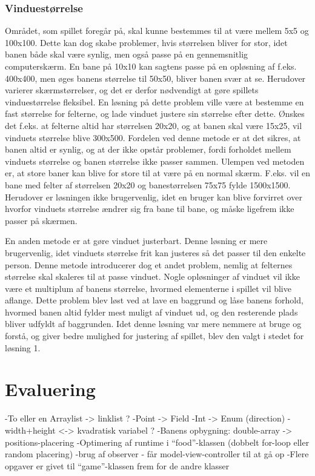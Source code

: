 \documentclass{report}
\begin{document}
\subsubsection{Vinduestørrelse}
Området, som spillet foregår på, skal kunne bestemmes til at være mellem 5x5 og 100x100. Dette kan dog skabe problemer, hvis størrelsen bliver for stor, idet banen både skal være synlig, men også passe på en gennemsnitlig computerskærm. En bane på 10x10 kan sagtens passe på en opløsning af f.eks. 400x400, men øges banens størrelse til 50x50, bliver banen svær at se. Herudover varierer skærmstørrelser, og det er derfor nødvendigt at gøre spillets vinduestørrelse fleksibel. En løsning på dette problem ville være at bestemme en fast størrelse for felterne, og lade vinduet justere sin størrelse efter dette. Ønskes det f.eks. at felterne altid har størrelsen 20x20, og at banen skal være 15x25, vil vinduets størrelse blive 300x500. Fordelen ved denne metode er at det sikres, at banen altid er synlig, og at der ikke opstår problemer, fordi forholdet mellem vinduets størrelse og banen størrelse ikke passer sammen. Ulempen ved metoden er, at store baner kan blive for store til at være på en normal skærm. F.eks. vil en bane med felter af størrelsen 20x20 og banestørrelsen 75x75 fylde 1500x1500. Herudover er løsningen ikke brugervenlig, idet en bruger kan blive forvirret over hvorfor vinduets størrelse ændrer sig fra bane til bane, og måske ligefrem ikke passer på skærmen.

En anden metode er at gøre vinduet justerbart. Denne løsning er mere brugervenlig, idet vinduets størrelse frit kan justeres så det passer til den enkelte person. Denne metode introducerer dog et andet problem, nemlig at felternes størrelse skal skaleres til at passe vinduet. Nogle opløsninger af vinduet vil ikke være et multiplum af banens størrelse, hvormed elementerne i spillet vil blive aflange. Dette problem blev løst ved at lave en baggrund og låse banens forhold, hvormed banen altid fylder mest muligt af vinduet ud, og den resterende plads bliver udfyldt af baggrunden. Idet denne løsning var mere nemmere at bruge og forstå, og giver bedre mulighed for justering af spillet, blev den valgt i stedet for løsning 1.

\section{Evaluering}
-To eller en Arraylist -> linklist ?
-Point -> Field
-Int -> Enum (direction)
-width+height <-> kvadratisk variabel ?
-Banens opbygning: double-array -> positions-placering
-Optimering af runtime i “food”-klassen (dobbelt for-loop eller random placering)
-brug af observer - får model-view-controller til at gå op
-Flere opgaver er givet til “game”-klassen frem for de andre klasser
\end{document}
